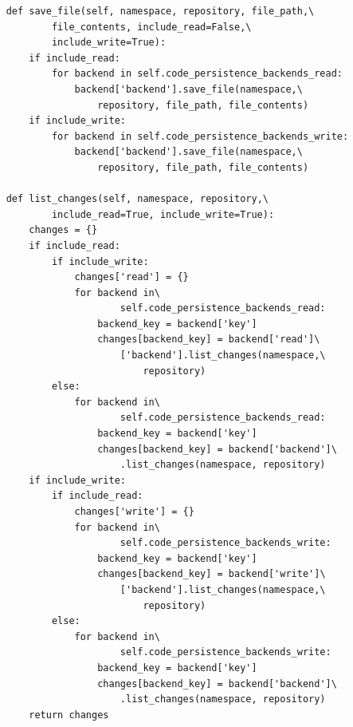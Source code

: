 \begin{lstlisting}
    def save_file(self, namespace, repository, file_path,\
            file_contents, include_read=False,\
            include_write=True):
        if include_read:
            for backend in self.code_persistence_backends_read:
                backend['backend'].save_file(namespace,\
                    repository, file_path, file_contents)
        if include_write:
            for backend in self.code_persistence_backends_write:
                backend['backend'].save_file(namespace,\
                    repository, file_path, file_contents)

    def list_changes(self, namespace, repository,\
            include_read=True, include_write=True):
        changes = {}
        if include_read:
            if include_write:
                changes['read'] = {}
                for backend in\
                        self.code_persistence_backends_read:
                    backend_key = backend['key']
                    changes[backend_key] = backend['read']\
                        ['backend'].list_changes(namespace,\
                            repository)
            else:
                for backend in\
                        self.code_persistence_backends_read:
                    backend_key = backend['key']
                    changes[backend_key] = backend['backend']\
                        .list_changes(namespace, repository)
        if include_write:
            if include_read:
                changes['write'] = {}
                for backend in\
                        self.code_persistence_backends_write:
                    backend_key = backend['key']
                    changes[backend_key] = backend['write']\
                        ['backend'].list_changes(namespace,\
                            repository)
            else:
                for backend in\
                        self.code_persistence_backends_write:
                    backend_key = backend['key']
                    changes[backend_key] = backend['backend']\
                        .list_changes(namespace, repository)
        return changes


\end{lstlisting}
